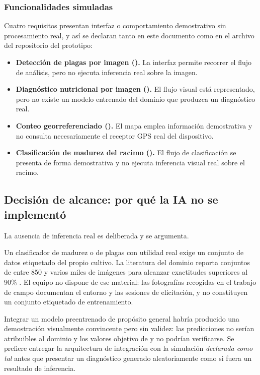 \subsubsection{Funcionalidades simuladas}

Cuatro requisitos presentan interfaz o comportamiento demostrativo sin procesamiento real, y así se
declaran tanto en este documento como en el archivo  del repositorio del prototipo:

\begin{itemize}[nosep]
  \item \textbf{Detección de plagas por imagen ().} La interfaz permite recorrer el flujo
        de análisis, pero no ejecuta inferencia real sobre la imagen.
  \item \textbf{Diagnóstico nutricional por imagen ().} El flujo visual está representado,
        pero no existe un modelo entrenado del dominio que produzca un diagnóstico real.
  \item \textbf{Conteo georreferenciado ().} El mapa emplea información demostrativa y
        no consulta necesariamente el receptor GPS real del dispositivo.
  \item \textbf{Clasificación de madurez del racimo ().} El flujo de clasificación se
        presenta de forma demostrativa y no ejecuta inferencia visual real sobre el racimo.
\end{itemize}

\subsection{Decisión de alcance: por qué la IA no se implementó}

La ausencia de inferencia real es deliberada y se argumenta.

Un clasificador de madurez o de plagas con utilidad real exige un conjunto de datos etiquetado del
propio cultivo. La literatura del dominio reporta conjuntos de entre 850 y varios miles de imágenes
para alcanzar exactitudes superiores al 90\% \cite{suharjito2021,omar2024,rosbi2024}. El equipo no
dispone de ese material: las fotografías recogidas en el trabajo de campo documentan el entorno y
las sesiones de elicitación, y no constituyen un conjunto etiquetado de entrenamiento.

Integrar un modelo preentrenado de propósito general habría producido una demostración visualmente
convincente pero sin validez: las predicciones no serían atribuibles al dominio y los valores
objetivo de  y  no podrían verificarse. Se prefiere entregar la arquitectura
de integración con la simulación \emph{declarada como tal} antes que presentar un diagnóstico
generado aleatoriamente como si fuera un resultado de inferencia.

